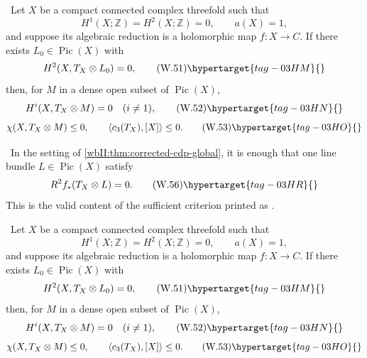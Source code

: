 \begin{theorem}
\hypertarget{tag-03J0}{}\label{wbII:thm:corrected-cdp-global}

\label{wbII:thm:corrected-global}
\ Let \(X\) be a compact connected complex threefold such that
\[
 H^1(X;\mathbb Z)=H^2(X;\mathbb Z)=0,\qquad a(X)=1,
\]
and suppose its algebraic reduction is a holomorphic map
\(f:X\to C\).  If there exists \(L_0\in\operatorname{Pic}(X)\) with
\[
 H^2(X,T_X\otimes L_0)=0,
\tag{W.51}\hypertarget{tag-03HM}{}\label{wbII:eq:W:5.24}
\]
then, for \(M\) in a dense open subset of \(\operatorname{Pic}(X)\),
\[
 H^i(X,T_X\otimes M)=0\quad(i\ne1),
\tag{W.52}\hypertarget{tag-03HN}{}\label{wbII:eq:W:5.25}
\]
\[
 \chi(X,T_X\otimes M)\le0,\qquad
 \left\langle c_3(T_X),[X]\right\rangle\le0.
\tag{W.53}\hypertarget{tag-03HO}{}\label{wbII:eq:W:5.26}
\]
\end{theorem}

\begin{corollary}\hypertarget{tag-03DT}{}\label{wbII:cor:corrected-cdp-relative}

\label{wbII:cor:relative}
\ In the setting of
\cref{wbII:thm:corrected-cdp-global}, it is enough that one line bundle
\(L\in\operatorname{Pic}(X)\) satisfy
\[
 R^2f_*(T_X\otimes L)=0.
\tag{W.56}\hypertarget{tag-03HR}{}\label{wbII:eq:W:5.29}
\]
This is the valid content of the sufficient criterion printed as
\cite[Proposition~2.4, p.~680]{CDP20}.
\end{corollary}

\begin{theorem}
\hypertarget{tag-03J0}{}\label{wbII:thm:corrected-cdp-global}

\label{wbII:thm:corrected-global}
\ Let \(X\) be a compact connected complex threefold such that
\[
 H^1(X;\mathbb Z)=H^2(X;\mathbb Z)=0,\qquad a(X)=1,
\]
and suppose its algebraic reduction is a holomorphic map
\(f:X\to C\).  If there exists \(L_0\in\operatorname{Pic}(X)\) with
\[
 H^2(X,T_X\otimes L_0)=0,
\tag{W.51}\hypertarget{tag-03HM}{}\label{wbII:eq:W:5.24}
\]
then, for \(M\) in a dense open subset of \(\operatorname{Pic}(X)\),
\[
 H^i(X,T_X\otimes M)=0\quad(i\ne1),
\tag{W.52}\hypertarget{tag-03HN}{}\label{wbII:eq:W:5.25}
\]
\[
 \chi(X,T_X\otimes M)\le0,\qquad
 \left\langle c_3(T_X),[X]\right\rangle\le0.
\tag{W.53}\hypertarget{tag-03HO}{}\label{wbII:eq:W:5.26}
\]
\end{theorem}

